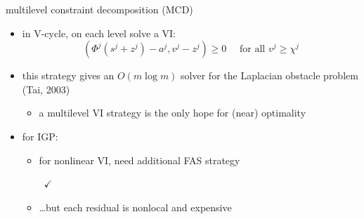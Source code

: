\documentclass[usepdftitle=false,usenames,dvipsnames]{beamer}
\newcommand{\ip}[2]{\left(#1,#2\right)}
\begin{document}
\begin{frame}{multilevel constraint decomposition (MCD)}

\begin{itemize}
\item in V-cycle, on each level solve a VI:
    $$\ip{\Phi^j(s^j + z^j) - a^j}{v^j - z^j} \ge 0 \quad \text{ for all $v^j \ge \chi^j$}$$

\item this strategy gives an $O(m\log m)$ solver for the Laplacian obstacle problem (Tai, 2003)
    \begin{itemize}
    \item \alert{a multilevel VI strategy is the only hope for (near) optimality}
    \end{itemize}
\item for IGP:
    \begin{itemize}
    \item for nonlinear VI, need additional FAS strategy {\Large\strut} {\color{ForestGreen} \, {\Large $\checkmark$}}
    \item \dots but each residual is nonlocal and expensive
    \end{itemize}
\end{itemize}
\end{frame}
\end{document}
